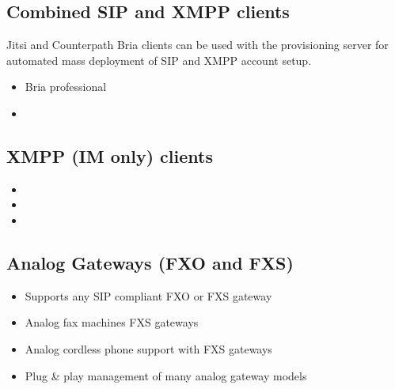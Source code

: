 \documentclass[letterpaper,10pt,english]{sphinxmanual}
\begin{document}
\subsection{Combined SIP and XMPP clients}
\label{\detokenize{features:combined-sip-and-xmpp-clients}}
Jitsi and Counterpath Bria clients can be used with the provisioning server for automated mass deployment of SIP and XMPP account setup.
\begin{itemize}
\item {} 
 Bria professional

\item {} 

\end{itemize}


\subsection{XMPP (IM only) clients}
\label{\detokenize{features:xmpp-im-only-clients}}\begin{itemize}
\item {} 

\item {} 

\item {} 

\end{itemize}


\subsection{Analog Gateways (FXO and FXS)}
\label{\detokenize{features:analog-gateways-fxo-and-fxs}}\begin{itemize}
\item {} 
Supports any SIP compliant FXO or FXS gateway

\item {} 
Analog fax machines FXS gateways

\item {} 
Analog cordless phone support with FXS gateways

\item {} 
Plug \& play management of many analog gateway models

\end{itemize}
\end{document}
